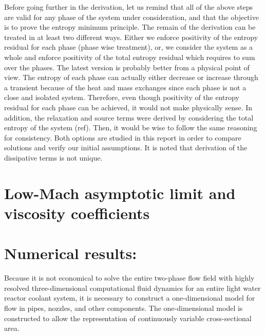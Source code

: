 Before going further in the derivation, let us remind that all of the above steps are valid for any phase of the system under consideration, and that the objective is to prove the entropy minimum principle. The remain of the derivation can be treated in at least two different ways. Either we enforce positivity of the entropy residual for each phase (phase wise treatment), or, we consider the system as a whole and enforce positivity of the total entropy residual which requires to sum over the phases. The latest version is probably  better from a physical point of view. The entropy of each phase can actually either decrease or increase through a transient because of the heat and mass exchanges since each phase is not a close and isolated system. Therefore, even though positivity of the entropy residual for each phase can be achieved, it would not make physically sense. In addition, the relaxation and source terms were derived by considering the total entropy of the system (ref). Then, it would be wise to follow the same reasoning for consistency. Both options are studied in this report in order to compare solutions and verify our initial assumptions. It is noted that derivation of the dissipative terms is not unique.
\section{Low-Mach asymptotic limit and viscosity coefficients}\label{sec:sev-equ-visc-coeff-sect4}
\section{Numerical results:}\label{sec:1d-num-res-sect4}
Because it is not economical to solve the entire two-phase flow field
with highly resolved three-dimensional computational fluid dynamics for an
entire light water reactor coolant system,
it is necessary to construct a one-dimensional model for flow in
pipes, nozzles, and other components.  The one-dimensional model is
constructed to allow the representation of continuously variable
cross-sectional area.

